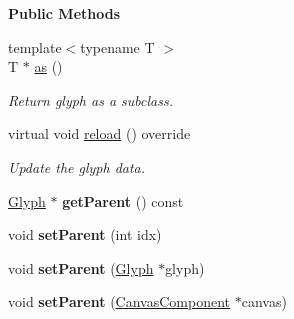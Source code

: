 \begin{Indent}\textbf{ Public Methods}\par
\begin{DoxyCompactItemize}
\item 
\mbox{\label{classrev_1_1_glyph_ab3987dcab70ece94faaa7b220fcea95c}} 
{\footnotesize template$<$typename T $>$ }\\T $\ast$ \mbox{\hyperlink{classrev_1_1_glyph_ab3987dcab70ece94faaa7b220fcea95c}{as}} ()
\begin{DoxyCompactList}\small\item\em Return glyph as a subclass. \end{DoxyCompactList}\item 
\mbox{\label{classrev_1_1_glyph_a6742f5a33859665b06159a289a359fa4}} 
virtual void \mbox{\hyperlink{classrev_1_1_glyph_a6742f5a33859665b06159a289a359fa4}{reload}} () override
\begin{DoxyCompactList}\small\item\em Update the glyph data. \end{DoxyCompactList}\item 
\mbox{\label{classrev_1_1_glyph_ad494e0a37ae2bb90560edf2edb149a6c}} 
\mbox{\hyperlink{classrev_1_1_glyph}{Glyph}} $\ast$ {\bfseries get\+Parent} () const
\item 
\mbox{\label{classrev_1_1_glyph_a66d3a53d6547af42e0b789ae5e13fa99}} 
void {\bfseries set\+Parent} (int idx)
\item 
\mbox{\label{classrev_1_1_glyph_a0717ebeea2f772409c06a3e64f5440ba}} 
void {\bfseries set\+Parent} (\mbox{\hyperlink{classrev_1_1_glyph}{Glyph}} $\ast$glyph)
\item 
\mbox{\label{classrev_1_1_glyph_a442faff419bf9bb9bf7f4a7a516db748}} 
void {\bfseries set\+Parent} (\mbox{\hyperlink{classrev_1_1_canvas_component}{Canvas\+Component}} $\ast$canvas)
\end{DoxyCompactItemize}
\end{Indent}

